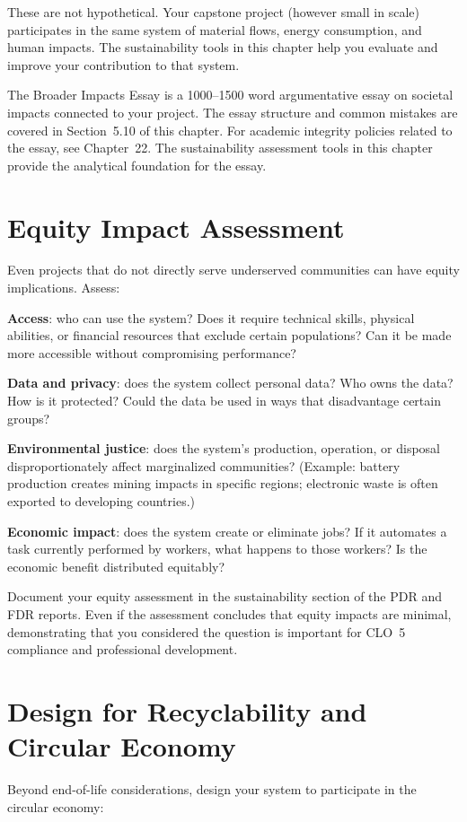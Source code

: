 These are not hypothetical. Your capstone project (however small in scale) participates in the same system of material flows, energy consumption, and human impacts. The sustainability tools in this chapter help you evaluate and improve your contribution to that system.


\begin{keyconceptbox}
The Broader Impacts Essay is a 1000--1500 word argumentative essay on societal impacts connected to your project. The essay structure and common mistakes are covered in Section~5.10 of this chapter. For academic integrity policies related to the essay, see Chapter~22. The sustainability assessment tools in this chapter provide the analytical foundation for the essay.
\end{keyconceptbox}

\section{Equity Impact Assessment}
Even projects that do not directly serve underserved communities can have equity implications. Assess:

\textbf{Access}: who can use the system? Does it require technical skills, physical abilities, or financial resources that exclude certain populations? Can it be made more accessible without compromising performance?

\textbf{Data and privacy}: does the system collect personal data? Who owns the data? How is it protected? Could the data be used in ways that disadvantage certain groups?

\textbf{Environmental justice}: does the system's production, operation, or disposal disproportionately affect marginalized communities? (Example: battery production creates mining impacts in specific regions; electronic waste is often exported to developing countries.)

\textbf{Economic impact}: does the system create or eliminate jobs? If it automates a task currently performed by workers, what happens to those workers? Is the economic benefit distributed equitably?

Document your equity assessment in the sustainability section of the PDR and FDR reports. Even if the assessment concludes that equity impacts are minimal, demonstrating that you considered the question is important for CLO~5 compliance and professional development.



\section{Design for Recyclability and Circular Economy}
Beyond end-of-life considerations, design your system to participate in the circular economy:

